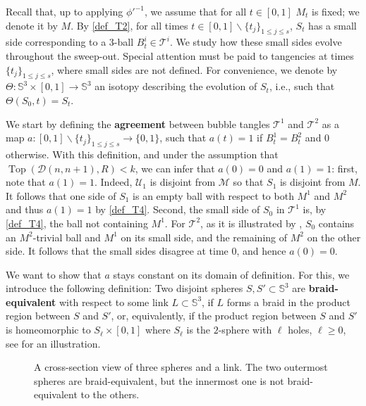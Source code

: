 \documentclass[10pt,a4paper]{amsart}
\newcommand{\Sp}{\mathbb{S}}
\newcommand{\T}{\mathcal{T}}
\newcommand{\addcross}{\operatorname{Top}}
\begin{document}
Recall that, up to applying $\phi'^{-1}$, we assume that for all $t \in [0,1]$ $M_t$ is fixed; we denote it by $M$. By \ref{def_T2}, for all times $t \in [0,1] \smallsetminus \{t_j\}_{1 \leq j \leq s}$, $S_t$ has a small side corresponding to a $3$-ball $B_t^i \in \T^i$. We study how these small sides evolve throughout the sweep-out. Special attention must be paid to tangencies at times $\{t_j\}_{1 \leq j \leq s}$, where small sides are not defined. For convenience, we denote by $\Theta: \Sp^3 \times [0,1] \to \Sp^3$ an isotopy describing the evolution of $S_t$, i.e., such that $\Theta(S_0,t)=S_t$. 

 
\medskip

We start by defining the \textbf{agreement} between bubble tangles $\T^1$ and $\T^2$ as a map $a : [0,1] \smallsetminus \{t_j\}_{1 \leq j \leq s} \rightarrow \{0,1\}$, such that $a(t) = 1$ if $B_t^1 = B_t^2$ and $0$ otherwise. With this definition, and under the assumption that $\addcross(\mathcal{D}(n,n+1), R)< k$, we can infer that $a(0) = 0$ and $a(1) =1$: first, note that $a(1)=1$. Indeed, $\mathcal{U}_1$ is disjoint from $\mathcal{M}$ so that $S_1$ is disjoint from $M$. It follows that one side of $S_1$ is an empty ball with respect to both $M^1$ and $M^2$ and thus $a(1)=1$ by \ref{def_T4}. Second, the small side of $S_0$ in $\T^1$ is, by \ref{def_T4}, the ball not containing $M^1$. For $\T^2$, as it is illustrated by , $S_0$ contains an $M^2$-trivial ball and $M^1$ on its small side, and the remaining of $M^2$ on the other side. It follows that the small sides disagree at time $0$, and hence $a(0)=0$.

We want to show that $a$ stays constant on its domain of definition. For this, we introduce the following definition: Two disjoint spheres $S, S' \subset \Sp^3$ are \textbf{braid-equivalent} with respect to some link $L \subset \Sp^3$, if $L$ forms a braid in the product region between $S$ and $S'$, or, equivalently, if the product region between $S$ and $S'$ is homeomorphic to $S_\ell \times [0,1]$ where $S_\ell$ is the $2$-sphere with $\ell$ holes, $\ell \geq 0$, see  for an illustration.
 
\begin{figure}[ht]
\begin{center}
\caption{A cross-section view of three spheres and a link. The two outermost spheres are braid-equivalent, but the innermost one is not braid-equivalent to the others.}
\label{pic_braid_equi}
\end{center}
\end{figure}
\end{document}
